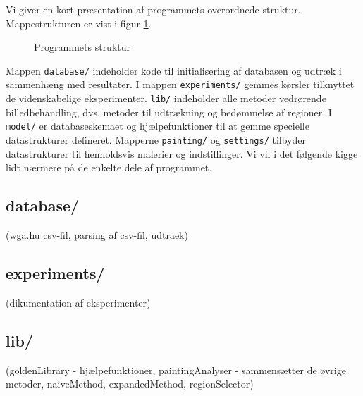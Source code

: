 {
{\sffamily Vi giver en kort præsentation af programmets overordnede
struktur. Mappestrukturen er vist i figur \ref{program_struktur}.

\begin{figure}[!h]
    \caption[]{Programmets struktur}
    \label{program_struktur}
\end{figure}

Mappen \texttt{database/} indeholder kode til initialisering af
databasen og udtræk i sammenhæng med resultater. I mappen
\texttt{experiments/} gemmes kørsler tilknyttet de videnskabelige
eksperimenter. \texttt{lib/} indeholder alle metoder vedrørende
billedbehandling, dvs. metoder til udtrækning og bedømmelse af regioner.
I \texttt{model/} er databaseskemaet og hjælpefunktioner til at gemme
specielle datastrukturer defineret. Mapperne \texttt{painting/} og
\texttt{settings/} tilbyder datastrukturer til henholdsvis malerier og
indstillinger. Vi vil i det følgende kigge lidt nærmere på de enkelte
dele af programmet.
}

\subsection{database/}
(wga.hu csv-fil, parsing af csv-fil, udtraek)

\subsection{experiments/}
(dikumentation af eksperimenter)

\subsection{lib/}
(goldenLibrary - hjælpefunktioner, paintingAnalyser - sammensætter de
øvrige metoder, naiveMethod, expandedMethod, regionSelector)

}
